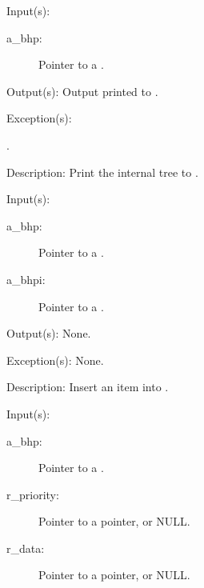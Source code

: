 \begin{capi}
\label{bhp_dump}
	\begin{capilist}
	\item[Input(s): ]
		\begin{description}\item[]
		\item[a\_bhp: ]
			Pointer to a .
		\end{description}
	\item[Output(s): ]
		Output printed to .
	\item[Exception(s): ]
		\begin{description}\item[]
		\item[.]
		\end{description}
	\item[Description: ]
		Print the internal tree to .
	\end{capilist}
\label{bhp_insert}
	\begin{capilist}
	\item[Input(s): ]
		\begin{description}\item[]
		\item[a\_bhp: ]
			Pointer to a \classname{bhp}.
		\item[a\_bhpi: ]
			Pointer to a \classname{bhpi}.
		\end{description}
	\item[Output(s): ] None.
	\item[Exception(s): ] None.
	\item[Description: ]
		Insert an item into \cvar{a\_bhp}.
	\end{capilist}
\label{bhp_min_find}
	\begin{capilist}
	\item[Input(s): ]
		\begin{description}\item[]
		\item[a\_bhp: ]
			Pointer to a .
		\item[r\_priority: ]
			Pointer to a pointer, or NULL.
		\item[r\_data: ]
			Pointer to a pointer, or NULL.

\end{description}
\end{capilist}
\end{capi}
